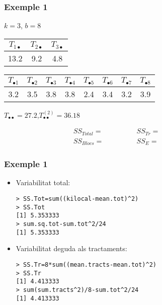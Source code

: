 \documentclass[12pt,t]{beamer}
\theoremstyle{plain}
\theoremstyle{definition}
\begin{document}
\begin{frame}
\frametitle{Exemple 1}
\vspace*{-2ex}


\begin{center}
$k=3$, $b=8$
\bigskip

\begin{tabular}{c|c|c}
${T_{1\bullet}}$ & ${T_{2\bullet}}$ & ${T_{3\bullet}}$  \\
\hline
13.2  & 9.2  & 4.8
\end{tabular}
\bigskip

\begin{tabular}{c|c|c|c|c|c|c|c}
${T_{\bullet1}}$ & ${T_{\bullet2}}$ & ${T_{\bullet3}}$ & ${T_{\bullet4}}$ & ${T_{\bullet5}}$ & ${T_{\bullet6}}$ & ${T_{\bullet7}}$ & ${T_{\bullet8}}$  \\
\hline
3.2 & 3.5 &  3.8 &  3.8 &  2.4 &  3.4 &  3.2 &  3.9
\end{tabular}
\bigskip


$T_{\bullet\bullet}=27.2$,\quad  $T^{(2)}_{\bullet\bullet}=36.18$

\end{center}

$$
\begin{array}{ll}
SS_{Total}=\qquad\qquad & SS_{Tr}=\qquad\qquad {}\\[3ex]

SS_{Blocs}= & SS_E=
\end{array}
$$

\end{frame}



\begin{frame}[fragile]
\frametitle{Exemple 1}

\begin{itemize}
\item Variabilitat total:
\begin{verbatim}
> SS.Tot=sum((kilocal-mean.tot)^2)
> SS.Tot
[1] 5.353333
> sum.sq.tot-sum.tot^2/24
[1] 5.353333
\end{verbatim}
\medskip

\item Variabilitat deguda als tractaments:

\begin{verbatim}
> SS.Tr=8*sum((mean.tracts-mean.tot)^2)
> SS.Tr
[1] 4.413333
> sum(sum.tracts^2)/8-sum.tot^2/24
[1] 4.413333
\end{verbatim}
\end{itemize}

\end{frame}
\end{document}
